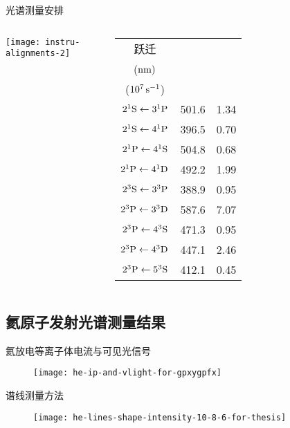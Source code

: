 \begin{CJK*}{UTF8}{kai}
\begin{frame}{光谱测量安排}
	\begin{columns}
	\begin{center}
		\texttt{[image: instru-alignments-2]}
	\end{center}
\begin{tabular}{ccc}\toprule
跃迁 & \makecell[c]{$\lambda_{q\to p}$\\ (${\rm nm})$} & \makecell[c]{$A_{q\to p}^{\rm eff}$\\ ($10^7\,{\rm s}^{-1}$)}\\
\hline
$2^1{\rm S}\leftarrow3^1{\rm P}$ & 501.6 & 1.34 \\
$2^1{\rm S}\leftarrow4^1{\rm P}$ & 396.5 & 0.70 \\
$2^1{\rm P}\leftarrow4^1{\rm S}$ & 504.8 & 0.68 \\
$2^1{\rm P}\leftarrow4^1{\rm D}$ & 492.2 & 1.99 \\
$2^3{\rm S}\leftarrow3^3{\rm P}$ & 388.9 & 0.95 \\
$2^3{\rm P}\leftarrow3^3{\rm D}$ & 587.6 & 7.07 \\
$2^3{\rm P}\leftarrow4^3{\rm S}$ & 471.3 & 0.95 \\
$2^3{\rm P}\leftarrow4^3{\rm D}$ & 447.1 & 2.46 \\
$2^3{\rm P}\leftarrow5^3{\rm S}$ & 412.1 & 0.45 \\
\bottomrule
\end{tabular}
	\end{columns}
\end{frame}

\subsection{氦原子发射光谱测量结果}

\begin{frame}{氦放电等离子体电流与可见光信号}
	\centering
  \begin{figure}
      \texttt{[image: he-ip-and-vlight-for-gpxygpfx]}
  \end{figure}
\end{frame}

\begin{frame}{谱线测量方法}
	\centering
  \begin{figure}
      \texttt{[image: he-lines-shape-intensity-10-8-6-for-thesis]}
  \end{figure}
\end{frame}


\end{CJK*}
